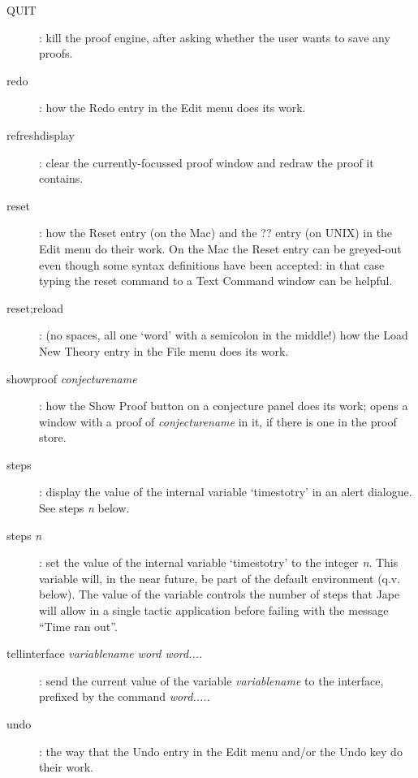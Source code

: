 \begin{description}
\item[QUIT]: kill the proof engine, after asking whether the user wants to save any proofs.

\item[redo]: how the Redo entry in the Edit menu does its work.

\item[refreshdisplay]: clear the currently-focussed proof window and redraw the proof it contains.


\item[reset]: how the Reset entry (on the Mac) and the ?? entry (on UNIX) in the Edit menu do their work. On the Mac the Reset entry can be greyed-out even though some syntax definitions have been accepted: in that case typing the reset command to a Text Command window can be helpful.


\item[reset;reload]: (no spaces, all one `word' with a semicolon in the middle!) how the Load New Theory entry in the File menu does its work.

\item[showproof \textit{conjecturename}]: how the Show Proof button on a conjecture panel does its work; opens a window with a proof of \textit{conjecturename} in it, if there is one in the proof store.


\item[steps]: display the value of the internal variable `timestotry' in an alert dialogue. See steps \textit{n} below.


\item[steps \textit{n}]: set the value of the internal variable `timestotry' to the integer \textit{n}. This variable will, in the near future, be part of the default environment (q.v. below). The value of the variable controls the number of steps that Jape will allow in a single tactic application before failing with the message ``Time ran out''.


\item[tellinterface \textit{variablename word word....}]: send the current value of the variable \textit{variablename} to the interface, prefixed by the command \textit{word....}.


\item[undo]: the way that the Undo entry in the Edit menu and/or the Undo key do their work.



\end{description}
